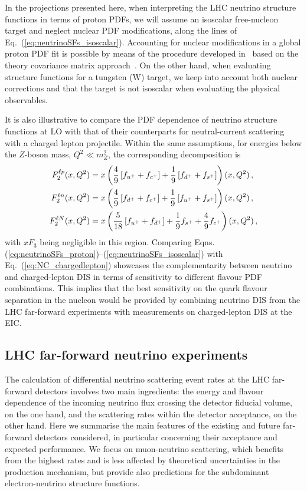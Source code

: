  In the projections presented here, when interpreting the LHC neutrino structure
 functions in terms of proton PDFs, we will assume an isoscalar free-nucleon target and neglect
 nuclear PDF modifications, along the lines of Eq.~(\ref{eq:neutrinoSFs_isoscalar}).
 Accounting for nuclear modifications in a global proton
 PDF fit is possible by means of the procedure developed
 in~\cite{Ball:2020xqw,Ball:2018twp} based on
 the theory covariance matrix approach~\cite{NNPDF:2019vjt,NNPDF:2019ubu}.
 On the other hand, when evaluating structure functions
 for a tungsten (W) target, we keep into account both
 nuclear corrections and that
 the target is not isoscalar when evaluating the physical observables.


 It is also illustrative to compare the PDF dependence of neutrino structure functions
 at LO with that of their counterparts for neutral-current
 scattering with a charged lepton projectile.
 Within the same assumptions, for energies below
 the $Z$-boson mass, $Q^2 \ll m_Z^2$, the corresponding
decomposition is
\begin{align}
	 F_2^{\ell p}(x,Q^2) &= x\left( {{4}\over {9}}\left[ f_{u^+} + f_{c^+}\right]
	+ {{1}\over {9}}\left[ f_{d^+} + f_{s^+}\right]\right)(x,Q^2) \, , \nonumber  \\
	F_2^{\ell n}(x,Q^2) &= x\left( {{4}\over {9}}\left[ f_{d^+} + f_{c^+}\right]
	+ {{1}\over {9}}\left[ f_{u^+} + f_{s^+}\right]\right)(x,Q^2) \, , \nonumber   \\
	F_2^{\ell N}(x,Q^2) &= x\left( {{5}\over {18}}\left[ f_{u^+} + f_{d^+}\right]
	+ {{1}\over {9}} f_{s^+} + {{4}\over {9}} f_{c^+} \right)(x,Q^2) \, , \label{eq:NC_chargedlepton} 
\end{align}
 with $xF_3$ being negligible in this region.
 Comparing Eqns. (\ref{eq:neutrinoSFs_proton})--(\ref{eq:neutrinoSFs_isoscalar})
 with Eq.~(\ref{eq:NC_chargedlepton}) showcases the complementarity between
 neutrino and charged-lepton DIS in terms of sensitivity
 to different flavour PDF combinations.
 This implies that the best sensitivity on the quark
  flavour separation in the nucleon
 would be provided by combining neutrino DIS from the
 LHC far-forward experiments with measurements on charged-lepton
 DIS at the EIC.

 \subsection{LHC far-forward neutrino experiments}
 \label{sec:neutrinoDetectors}

 The calculation of differential neutrino scattering event rates
 at the LHC far-forward detectors involves two main ingredients: the energy
 and flavour dependence of the incoming neutrino flux crossing
 the detector fiducial volume, on the one hand,
 and the scattering rates within the detector acceptance, on the other hand.
 Here we summarise the main features of the existing and future
 far-forward detectors considered, in particular concerning
 their acceptance and expected performance.
 We focus on  muon-neutrino scattering, which benefits from the highest rates and is less
 affected by theoretical uncertainties in the production mechanism, but
 provide also predictions for the subdominant electron-neutrino structure functions.
 
